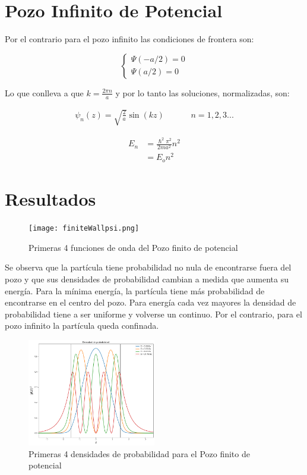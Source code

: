 \documentclass[a4paper]{article}
\theoremstyle{definition}
\theoremstyle{plain}
\begin{document}
\section*{Pozo Infinito de Potencial}

Por el contrario para el pozo infinito las condiciones de frontera son:

$$
\begin{cases}
\Psi(-a/2) = 0 \\
\Psi(a/2) = 0
\end{cases}
$$

Lo que conlleva a que $k = \frac{2 \pi n}{a}$ y por lo tanto las soluciones, normalizadas, son:

\begin{align*}
    \psi_n(z) = \sqrt{\frac{2}{a}} \sin{(k z)} &&  &&  n= 1,2,3 ...
\end{align*}

\begin{align*}
    E_n &= \frac{\hslash^2 \pi^2}{2m a^2}  n^2\\
    &= E_o n^2
\end{align*}

\section{Resultados}

\begin{figure}
\begin {center}
\texttt{[image: finiteWallpsi.png]}
\caption{Primeras 4 funciones de onda del Pozo finito de potencial}
\label{fig:finiteWell}
\end {center}
\end{figure}

Se observa que la partícula tiene probabilidad no nula de encontrarse fuera del pozo y que sus densidades de probabilidad cambian a medida que aumenta su energía. Para la mínima energía, la partícula tiene más probabilidad de encontrarse en el centro del pozo. Para energía cada vez mayores la densidad de probabilidad tiene a ser uniforme y volverse un continuo. Por el contrario, para el pozo infinito la partícula queda confinada. 

\begin{figure}
\begin {center}
\includegraphics[width=0.50\textwidth]{finiteWallDensity.png}
\caption{Primeras 4 densidades de probabilidad para el Pozo finito de potencial}
\label{fig:finiteWelldensity}
\end {center}
\end{figure}
\end{document}
